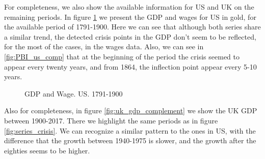 \documentclass[a4paper,10cpi]{article}
\begin{document}
	For completeness, we also show the available information for US and UK on the remaining periods. In figure \ref{fig:us_complement} we present the GDP and wages for US in gold, for the available period of 1791-1900. Here we can see that although both series share a similar trend, the detected crisis points in the GDP don't seem to be reflected, for the most of the cases, in the wages data. Also, we can see in \ref{fig:PBI_us_comp} that at the beginning of the period the crisis seemed to appear every twenty years, and from 1864, the inflection point appear every 5-10 years. 
	
	\begin{figure}[H]
		\centering
		\caption{GDP and Wage. US. 1791-1900} \label{fig:us_complement}
	\end{figure}
	
	 
	 Also for completeness, in figure \ref{fig:uk_gdp_complement} we show the UK GDP between 1900-2017. There we highlight the same periods as in figure \ref{fig:series_crisis}. We can recognize a similar pattern to the ones in US, with the difference that the growth between 1940-1975 is slower, and the growth after the eighties seems to be higher. 
	 
\end{document}

